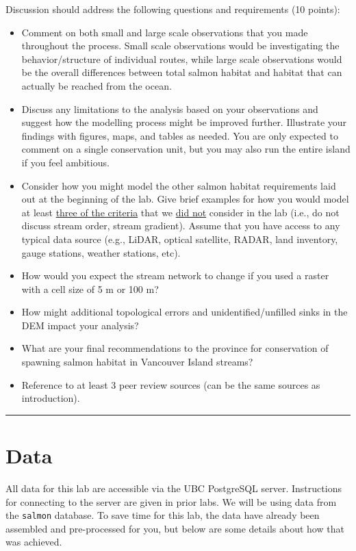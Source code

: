 \documentclass[
]{book}
\begin{document}
Discussion should address the following questions and requirements (10 points):

\begin{itemize}
\item
  Comment on both small and large scale observations that you made throughout the process. Small scale observations would be investigating the behavior/structure of individual routes, while large scale observations would be the overall differences between total salmon habitat and habitat that can actually be reached from the ocean.
\item
  Discuss any limitations to the analysis based on your observations and suggest how the modelling process might be improved further. Illustrate your findings with figures, maps, and tables as needed. You are only expected to comment on a single conservation unit, but you may also run the entire island if you feel ambitious.
\item
  Consider how you might model the other salmon habitat requirements laid out at the beginning of the lab. Give brief examples for how you would model at least \ul{three of the criteria} that we \ul{did not} consider in the lab (i.e., do not discuss stream order, stream gradient). Assume that you have access to any typical data source (e.g., LiDAR, optical satellite, RADAR, land inventory, gauge stations, weather stations, etc).
\item
  How would you expect the stream network to change if you used a raster with a cell size of 5 m or 100 m?
\item
  How might additional topological errors and unidentified/unfilled sinks in the DEM impact your analysis?
\item
  What are your final recommendations to the province for conservation of spawning salmon habitat in Vancouver Island streams?
\item
  Reference to at least 3 peer review sources (can be the same sources as introduction).
\end{itemize}

\begin{center}\rule{0.5\linewidth}{0.5pt}\end{center}

\hypertarget{data-1}{%
\section*{Data}\label{data-1}}

All data for this lab are accessible via the UBC PostgreSQL server. Instructions for connecting to the server are given in prior labs. We will be using data from the \texttt{salmon} database. To save time for this lab, the data have already been assembled and pre-processed for you, but below are some details about how that was achieved.
\end{document}

